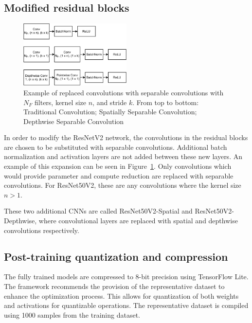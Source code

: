 \documentclass{article}
\begin{document}
	\subsection{Modified residual blocks}
	
	\begin{figure}[h!]
		\centering
		\includegraphics[width=0.5\textwidth]{images/conv-structure.pdf}
		\caption{Example of replaced convolutions with separable convolutions with $N_F$ filters, kernel size $n$, and stride $k$. From top to bottom: Traditional Convolution; Spatially Separable Convolution; Depthwise Separable Convolution}
		\label{fig:conv-structure}
	\end{figure}
	
	In order to modify the ResNetV2 network, the convolutions in the residual blocks are chosen to be substituted with separable convolutions. Additional batch normalization and activation layers are not added between these new layers. An example of this expansion can be seen in Figure~\ref{fig:conv-structure}. Only convolutions which would provide parameter and compute reduction are replaced with separable convolutions. For ResNet50V2, these are any convolutions where the kernel size $n > 1$.
	
	These two additional CNNs are called ResNet50V2-Spatial and ResNet50V2-Depthwise, where convolutional layers are replaced with spatial and depthwise convolutions respectively. 
	
	
	\subsection{Post-training quantization and compression}
	The fully trained models are compressed to 8-bit precision using TensorFlow Lite. The framework recommends the provision of the representative dataset to enhance the optimization process. This allows for quantization of both weights and activations for quantizable operations. The representative dataset is compiled using 1000 samples from the training dataset. 	
	
\end{document}
